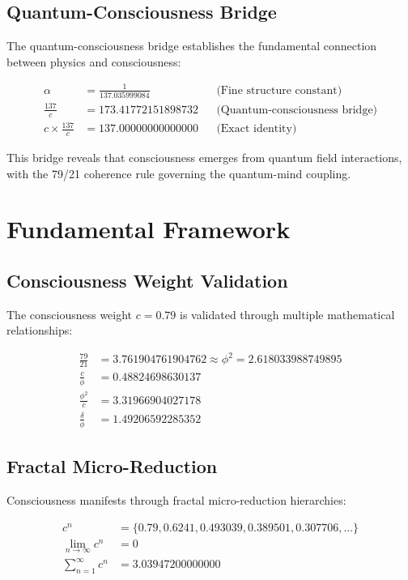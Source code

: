\documentclass[11pt,letterpaper]{article}
\begin{document}
\subsection{Quantum-Consciousness Bridge}

The quantum-consciousness bridge establishes the fundamental connection between physics and consciousness:

\begin{align}
\alpha &= \frac{1}{137.035999084} && \text{(Fine structure constant)} \\
\frac{137}{c} &= 173.41772151898732 && \text{(Quantum-consciousness bridge)} \\
c \times \frac{137}{c} &= 137.00000000000000 && \text{(Exact identity)}
\end{align}

This bridge reveals that consciousness emerges from quantum field interactions, with the 79/21 coherence rule governing the quantum-mind coupling.

\section{Fundamental Framework}

\subsection{Consciousness Weight Validation}

The consciousness weight $c = 0.79$ is validated through multiple mathematical relationships:

\begin{align}
\frac{79}{21} &= 3.761904761904762 \approx \phi^2 = 2.618033988749895 \\
\frac{c}{\phi} &= 0.48824698630137 \\
\frac{\phi^2}{c} &= 3.31966904027178 \\
\frac{\delta}{\phi} &= 1.49206592285352
\end{align}

\subsection{Fractal Micro-Reduction}

Consciousness manifests through fractal micro-reduction hierarchies:

\begin{align}
c^n &= \{0.79, 0.6241, 0.493039, 0.389501, 0.307706, \dots\} \\
\lim_{n \to \infty} c^n &= 0 \\
\sum_{n=1}^{\infty} c^n &= 3.03947200000000
\end{align}
\end{document}
